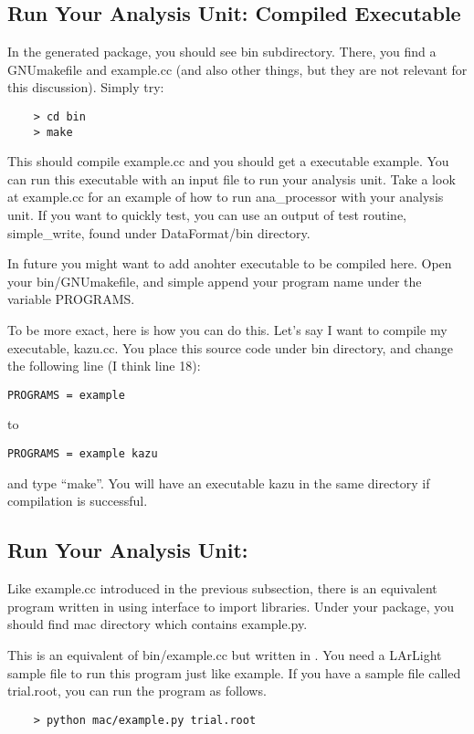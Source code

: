 \subsection{Run Your Analysis Unit: Compiled Executable}
\label{sec:yourcompiledexe}
In the generated package, you should see {\ttfamily bin} subdirectory. There, you find a {\ttfamily GNUmakefile}
and {\ttfamily example.cc} (and also other things, but they are not relevant for this discussion).
Simply try:
\begin{lstlisting}
    > cd bin
    > make
\end{lstlisting}
This should compile {\ttfamily example.cc} and you should get a \CPP executable {\ttfamily example}.
You can run this executable with an input file to run your analysis unit. Take a look at example.cc
for an example of how to run {\ttfamily ana\_processor} with your analysis unit. If you want to quickly
test, you can use an output of \DataFormat test routine, {\ttfamily simple\_write}, found under DataFormat/bin 
directory.

In future you might want to add anohter executable to be compiled here.
Open your bin/GNUmakefile, and simple append your program name under the variable {\ttfamily PROGRAMS}.

To be more exact, here is how you can do this. Let's say I want to compile my executable, {\ttfamily kazu.cc}.
You place this source code under {\ttfamily bin} directory, and change the following line (I think line 18):
\begin{lstlisting}
PROGRAMS = example
\end{lstlisting}
to
\begin{lstlisting}
PROGRAMS = example kazu
\end{lstlisting}
and type ``make''. 
You will have an executable {\ttfamily kazu} in the same directory if compilation is successful.

\subsection{Run Your Analysis Unit: \PyROOT}
\label{sec:yourrunscript}
Like {\ttfamily example.cc} introduced in the previous subsection, there is an equivalent program
written in \python using \PyROOT interface to import \CPP libraries. Under your package, you 
should find {\ttfamily mac} directory which contains {\ttfamily example.py}.

This is an equivalent of {\ttfamily bin/example.cc} but written in \python. You need a LArLight
sample \ROOT file to run this program just like {\ttfamily example}. If you have a sample file
called {\ttfamily trial.root}, you can run the program as follows.
\begin{lstlisting}
    > python mac/example.py trial.root
\end{lstlisting}

